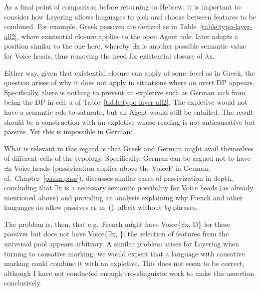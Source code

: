 \begin{exe}
\begin{xlist}
\begin{exe}
\begin{exe}
\begin{xlist}
\begin{exe}
\begin{exe}
\begin{exe}
\begin{exe}
\begin{exe}
\begin{xlist}
As a final point of comparison before returning to Hebrew, it is important to consider how Layering allows languages to pick and choose between features to be combined. For example, Greek passives are derived as in Table~\ref{table:typo-layer-all2}, where existential closure applies to the open Agent role. \cite{schaefer17oup} later adopts a position similar to the one here, whereby $\exists$x is another possible semantic value for Voice heads, thus removing the need for existential closure of $\lambda$x. 

Either way, given that existential closure can apply at some level as in Greek, the question arises of why it does not apply in situations where an overt DP appears. Specifically, there is nothing to prevent an expletive such as German \emph{sich} from being the DP in cell~a of Table~\ref{table:typo-layer-all2}. The expletive would not have a semantic role to saturate, but an Agent would still be entailed. The result should be a construction with an expletive whose reading is not anticausative but passive. Yet this is impossible in German:
 \begin{exe}
	
 \z 

What is relevant in this regard is that Greek and German might avail themselves of different cells of the typology. Specifically, German can be argued not to have $\exists$x Voice heads (passivization applies above the VoiceP in German; cf.~Chapter~\ref{passn:pass}). \cite{schaefer17oup} discusses similar cases of passivization in depth, concluding that $\exists$x is a necessary semantic possibility for Voice heads (as already mentioned above) and providing an analysis explaining why French and other languages do allow passives as in~(\lastx), albeit without \emph{by}-phrases. 

The problem is, then, that e.g.~French might have Voice\{$\exists$x, D\} for these passives but does not have Voice\{$\exists$x, \zero\}; the selection of features from the universal pool appears arbitrary. A similar problem arises for Layering when turning to causative marking: we would expect that a language with causative marking could combine it with an expletive. This does not seem to be correct, although I have not conducted enough crosslinguistic work to make this assertion conclusively. 


\end{exe}
\end{xlist}
\end{exe}
\end{exe}
\end{exe}
\end{exe}
\end{exe}
\end{xlist}
\end{exe}
\end{exe}
\end{xlist}
\end{exe}
